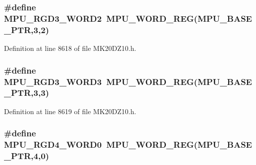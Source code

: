 \subsubsection[{\texorpdfstring{M\+P\+U\+\_\+\+R\+G\+D3\+\_\+\+W\+O\+R\+D2}{MPU_RGD3_WORD2}}]{\setlength{\rightskip}{0pt plus 5cm}\#define M\+P\+U\+\_\+\+R\+G\+D3\+\_\+\+W\+O\+R\+D2~{\bf M\+P\+U\+\_\+\+W\+O\+R\+D\+\_\+\+R\+EG}({\bf M\+P\+U\+\_\+\+B\+A\+S\+E\+\_\+\+P\+TR},3,2)}\hypertarget{group___m_p_u___register___accessor___macros_ga107ae842371d3536fbc15ca2f261bbe4}{}\label{group___m_p_u___register___accessor___macros_ga107ae842371d3536fbc15ca2f261bbe4}


Definition at line 8618 of file M\+K20\+D\+Z10.\+h.

\subsubsection[{\texorpdfstring{M\+P\+U\+\_\+\+R\+G\+D3\+\_\+\+W\+O\+R\+D3}{MPU_RGD3_WORD3}}]{\setlength{\rightskip}{0pt plus 5cm}\#define M\+P\+U\+\_\+\+R\+G\+D3\+\_\+\+W\+O\+R\+D3~{\bf M\+P\+U\+\_\+\+W\+O\+R\+D\+\_\+\+R\+EG}({\bf M\+P\+U\+\_\+\+B\+A\+S\+E\+\_\+\+P\+TR},3,3)}\hypertarget{group___m_p_u___register___accessor___macros_gad2ea52e05952feac126e5fbcc01fd6ef}{}\label{group___m_p_u___register___accessor___macros_gad2ea52e05952feac126e5fbcc01fd6ef}


Definition at line 8619 of file M\+K20\+D\+Z10.\+h.

\subsubsection[{\texorpdfstring{M\+P\+U\+\_\+\+R\+G\+D4\+\_\+\+W\+O\+R\+D0}{MPU_RGD4_WORD0}}]{\setlength{\rightskip}{0pt plus 5cm}\#define M\+P\+U\+\_\+\+R\+G\+D4\+\_\+\+W\+O\+R\+D0~{\bf M\+P\+U\+\_\+\+W\+O\+R\+D\+\_\+\+R\+EG}({\bf M\+P\+U\+\_\+\+B\+A\+S\+E\+\_\+\+P\+TR},4,0)}\hypertarget{group___m_p_u___register___accessor___macros_ga919006df74fef810e4c5e7f2a7b028fd}{}\label{group___m_p_u___register___accessor___macros_ga919006df74fef810e4c5e7f2a7b028fd}


